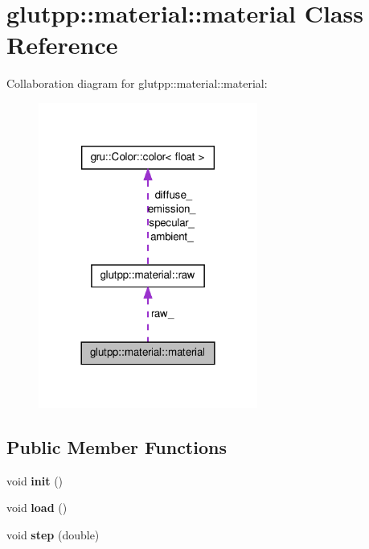 \hypertarget{classglutpp_1_1material_1_1material}{\section{glutpp\-:\-:material\-:\-:material \-Class \-Reference}
\label{classglutpp_1_1material_1_1material}
}


\-Collaboration diagram for glutpp\-:\-:material\-:\-:material\-:
\nopagebreak
\begin{figure}[H]
\begin{center}
\leavevmode
\includegraphics[width=204pt]{classglutpp_1_1material_1_1material__coll__graph}
\end{center}
\end{figure}
\subsection*{\-Public \-Member \-Functions}
\begin{DoxyCompactItemize}
\item 
\hypertarget{classglutpp_1_1material_1_1material_a5610c4dc9129ecc5fa6b28814fcf147e}{void {\bfseries init} ()}\label{classglutpp_1_1material_1_1material_a5610c4dc9129ecc5fa6b28814fcf147e}

\item 
\hypertarget{classglutpp_1_1material_1_1material_a70897de59b78a8fbd8ddf85e92385e98}{void {\bfseries load} ()}\label{classglutpp_1_1material_1_1material_a70897de59b78a8fbd8ddf85e92385e98}

\item 
\hypertarget{classglutpp_1_1material_1_1material_ae2b179fde85146dc1d8b0ca98e92cb7e}{void {\bfseries step} (double)}\label{classglutpp_1_1material_1_1material_ae2b179fde85146dc1d8b0ca98e92cb7e}

\end{DoxyCompactItemize}
